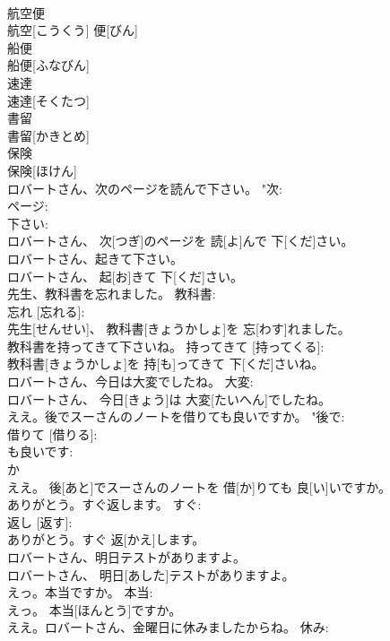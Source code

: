 \documentclass[8pt]{extreport}
\begin{document}
\begin{CJK}{UTF8}{min}
\\	航空便	
\\	航空[こうくう] 便[びん]		
\\	船便	
\\	船便[ふなびん]		
\\	速達	
\\	速達[そくたつ]		
\\	書留	
\\	書留[かきとめ]		
\\	保険	
\\	保険[ほけん]		
\\	ロバートさん、次のページを読んで下さい。	"次: 
\\	ページ: 
\\	下さい: 
\\	ロバートさん、 次[つぎ]のページを 読[よ]んで 下[くだ]さい。		
\\	ロバートさん、起きて下さい。	
\\	ロバートさん、 起[お]きて 下[くだ]さい。	
\\	先生、教科書を忘れました。	教科書: 
\\	忘れ [忘れる]: 
\\	先生[せんせい]、 教科書[きょうかしょ]を 忘[わす]れました。		
\\	教科書を持ってきて下さいね。	持ってきて [持ってくる]: 
\\	教科書[きょうかしょ]を 持[も]ってきて 下[くだ]さいね。		
\\	ロバートさん、今日は大変でしたね。	大変: 
\\	ロバートさん、 今日[きょう]は 大変[たいへん]でしたね。		
\\	ええ。後でスーさんのノートを借りても良いですか。	"後で: 
\\	借りて [借りる]: 
\\	も良いです: 
\\	か 
\\	ええ。 後[あと]でスーさんのノートを 借[か]りても 良[い]いですか。		
\\	ありがとう。すぐ返します。	すぐ: 
\\	返し [返す]: 
\\	ありがとう。すぐ 返[かえ]します。		
\\	ロバートさん、明日テストがありますよ。	
\\	ロバートさん、 明日[あした]テストがありますよ。	
\\	えっ。本当ですか。	本当: 
\\	えっ。 本当[ほんとう]ですか。		
\\	ええ。ロバートさん、金曜日に休みましたからね。	休み: 

\end{CJK}
\end{document}
